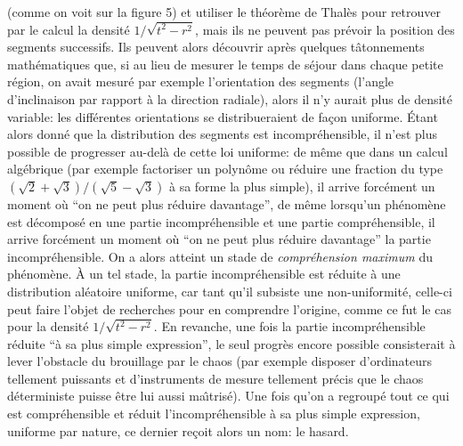 (comme on voit  sur la figure 5) et utiliser le th\'eor\`eme de Thal\`es 
pour retrouver par  le calcul la densit\'e  $1 / \sqrt{t^2 - r^2}$, mais ils 
ne peuvent pas pr\'evoir la position des segments successifs. Ils peuvent 
alors d\'ecouvrir apr\`es quelques t\^atonnements math\'ematiques que, 
si au lieu de mesurer le temps de s\'ejour dans chaque petite r\'egion, on 
avait mesur\'e par exemple l'orientation des segments (l'angle 
d'inclinaison par rapport \`a la direction radiale), alors il n'y aurait plus 
de densit\'e variable: les diff\'erentes orientations se distribueraient de 
fa\c con uniforme. \'Etant alors donn\'e que la distribution des segments 
est incompr\'ehensible, il n'est plus possible de progresser au-del\`a de  
cette loi uniforme: de m\^eme que dans un calcul alg\'ebrique (par  
exemple factoriser un polyn\^ome ou r\'eduire une fraction du type 
$(\sqrt{2} + \sqrt{3}) /  (\sqrt{5} -\sqrt{3})$ \`a sa forme la plus 
simple),  il arrive forc\'ement un moment o\`u ``on ne peut plus r\'eduire 
davantage'', de m\^eme lorsqu'un ph\'enom\`ene est  d\'ecompos\'e en une 
partie incompr\'ehensible et une partie compr\'ehensible, il arrive  
forc\'ement un moment o\`u ``on ne peut plus r\'eduire davantage'' la  
partie incompr\'ehensible. On a alors atteint un stade de 
{\it compr\'ehension maximum} du ph\'enom\`ene. \`A un tel stade, la 
partie incompr\'ehensible est r\'eduite \`a une distribution al\'eatoire 
uniforme, car tant qu'il subsiste une non-uniformit\'e, celle-ci peut faire 
l'objet de recherches pour en comprendre l'origine, comme ce fut le cas 
pour la densit\'e $1/\sqrt{t^2-r^2}$. En revanche, une fois la partie 
incompr\'ehensible r\'eduite ``\`a sa plus simple expression'', le seul 
progr\`es encore possible consisterait \`a lever l'obstacle du brouillage 
par le chaos (par exemple disposer d'ordinateurs  tellement puissants et 
d'instruments de mesure tellement pr\'ecis que  le chaos d\'eterministe 
puisse \^etre lui aussi ma\^\i tris\'e).  
\medskip 
Une fois qu'on a regroup\'e tout ce qui est compr\'ehensible et r\'eduit   
l'incompr\'ehensible \`a sa plus  simple expression, uniforme par 
nature, ce dernier re\c coit alors un nom: le hasard. 
 
\vfill\break 
 
 
 
\bye 
